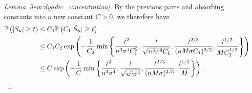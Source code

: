 \begin{proof}[Lemma~\ref{lem:dyadic_concentration}]

  By the previous parts
  and absorbing constants into a new constant $C > 0$,
  we therefore have
  \begin{align*}
    \P\left(
      |S_n| \geq t
    \right)
    &\leq
    C_1 \P\left(
      C_1 |\tilde S_n| \geq t
    \right) \\
    &\leq
    C_1 C_2 \exp\left(
      -\frac{1}{C_2}
      \min \left\{
        \frac{t^2}{n^3 \sigma^4 C_1^2},
        \frac{t}{\sqrt{n^3 \sigma^4 C_1}},
        \frac{t^{2/3}}{(n M \sigma C_1)^{2/3}},
        \frac{t^{1/2}}{M C_1^{1/2}}
      \right\}
    \right) \\
    &\leq
    C \exp\left(
      -\frac{1}{C}
      \min \left\{
        \frac{t^2}{n^3 \sigma^4},
        \frac{t}{\sqrt{n^3 \sigma^4}},
        \frac{t^{2/3}}{(n M \sigma)^{2/3}},
        \frac{t^{1/2}}{M}
      \right\}
    \right).
  \end{align*}
\end{proof}

